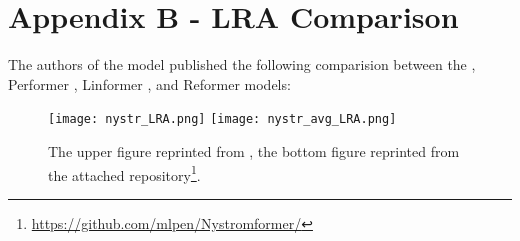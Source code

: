 \chapter*{Appendix B - LRA Comparison}

The authors of the \nystr{} model \citep{nystrom} published the following comparision between the \nystr{}, Performer \citep{performer}, Linformer \citep{linformer}, and Reformer \citep{reformer} models:

\begin{figure}[!htb]
    \centering
    \texttt{[image: nystr\_LRA.png]}
    \texttt{[image: nystr\_avg\_LRA.png]}
    \caption*{The upper figure reprinted from \citep{nystrom}, the bottom figure reprinted from the attached repository\footnote{\url{https://github.com/mlpen/Nystromformer/}}.}
\end{figure}